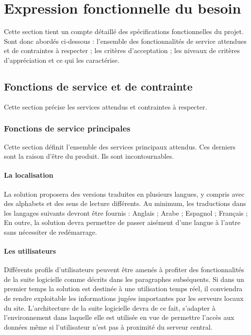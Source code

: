 \documentclass[11pt,fleqn]{book} %
\begin{document}

\chapter{Expression fonctionnelle du besoin}
Cette section tient un compte détaillé des spécifications fonctionnelles du projet. Sont donc abordés ci-dessous :
l'ensemble des fonctionnalités de service attendues et de contraintes à respecter ;
les critères d'acceptation ;
les niveaux de critères d'appréciation et ce qui les caractérise. 

\section{Fonctions de service et de contrainte}
Cette section précise les services attendus et contraintes à respecter.

\subsection{Fonctions de service principales}
Cette section définit l'ensemble des services principaux attendus. Ces derniers sont la raison d'être du produit. Ils sont incontournables.

\subsubsection{La localisation}
La solution proposera des versions traduites en plusieurs langues, y compris avec des alphabets et des sens de lecture différents. Au minimum, les traductions dans les langages suivants devront être fournis :
Anglais ;
Arabe ;
Espagnol ;
Français ;
En outre, la solution devra permettre de passer aisément d'une langue à l'autre sans nécessiter de redémarrage.

\subsubsection{Les utilisateurs}
Différents profils d'utilisateurs peuvent être amenés à profiter des fonctionnalités de la suite logicielle comme décrits dans les paragraphes subséquents. 
Si dans un premier temps la solution est destinée à une utilisation temps réel, il conviendra de rendre exploitable les informations jugées importantes par les serveurs locaux du site.
L'architecture de la suite logicielle devra de ce fait, s'adapter à l'environnement dans laquelle elle est utilisée en vue de permettre l'accès aux données même si l'utilisateur n'est pas à proximité du serveur central.
\end{document}
